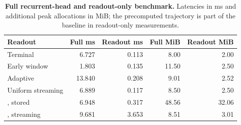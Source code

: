 \begin{table}[htbp]
\centering
\caption{\textbf{Full recurrent-head and readout-only benchmark.} Latencies in ms and additional peak allocations in MiB; the precomputed trajectory is part of the baseline in readout-only measurements.}
\label{tab:cost_detail}
\small
\begin{tabular}{lrrrr}
\toprule
Readout & Full ms & Readout ms & Full MiB & Readout MiB \\
\midrule
Terminal & 6.727 & 0.113 & 8.00 & 2.00 \\
Early window & 1.803 & 0.135 & 11.50 & 2.50 \\
Adaptive & 13.840 & 0.208 & 9.01 & 2.52 \\
Uniform streaming & 6.889 & 0.117 & 8.50 & 2.50 \\
\grace{}, stored & 6.948 & 0.317 & 48.56 & 32.06 \\
\grace{}, streaming & 9.681 & 3.653 & 8.51 & 3.01 \\
\bottomrule
\end{tabular}
\end{table}
